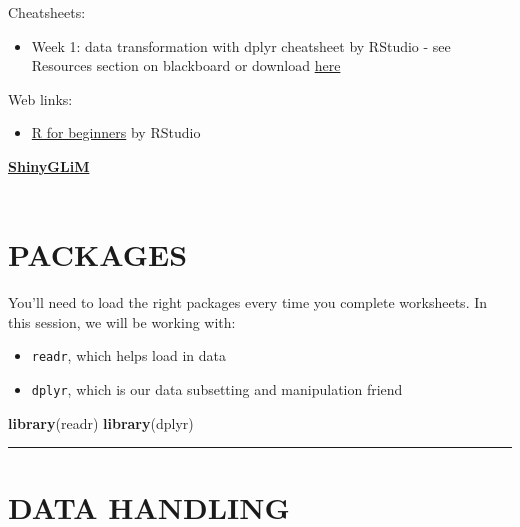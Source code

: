 \documentclass[
]{book}
\newenvironment{Shaded}{\begin{snugshade}}{\end{snugshade}}
\newcommand{\KeywordTok}[1]{\textcolor[rgb]{0.13,0.29,0.53}{\textbf{#1}}}
\newcommand{\NormalTok}[1]{#1}
\providecommand{\tightlist}{%
  \setlength{\itemsep}{0pt}\setlength{\parskip}{0pt}}
\begin{document}
Cheatsheets:

\begin{itemize}
\tightlist
\item
  Week 1: data transformation with dplyr cheatsheet by RStudio -
  see Resources section on blackboard or download
  \href{https://github.com/rstudio/cheatsheets/raw/master/data-transformation.pdf}{here}
\end{itemize}

Web links:

\begin{itemize}
\tightlist
\item
  \href{https://education.rstudio.com/learn/beginner\%22}{R for beginners} by RStudio
  ~
\end{itemize}

\href{https://iainmstott.shinyapps.io/ShinyGLiM}{\textbf{ShinyGLiM}}\\
~\\

\hypertarget{packages}{%
\section{PACKAGES}\label{packages}}

You'll need to load the right packages every time you complete worksheets. In
this session, we will be working with:

\begin{itemize}
\tightlist
\item
  \texttt{readr}, which helps load in data
\item
  \texttt{dplyr}, which is our data subsetting and manipulation friend
\end{itemize}

\begin{Shaded}
\begin{Highlighting}[]
\KeywordTok{library}\NormalTok{(readr)}
\KeywordTok{library}\NormalTok{(dplyr)}
\end{Highlighting}
\end{Shaded}

\begin{center}\rule{0.5\linewidth}{\linethickness}\end{center}

\hypertarget{data-handling}{%
\section{DATA HANDLING}\label{data-handling}}
\end{document}
